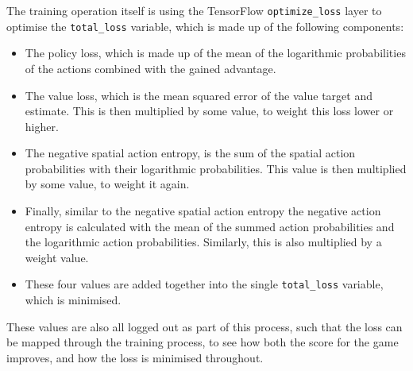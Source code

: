 The training operation itself is using the TensorFlow \texttt{optimize\_loss}
layer to optimise the \texttt{total\_loss} variable, which is made up of the
following components:

\begin{itemize}
    \item The policy loss, which is made up of the mean of the logarithmic
        probabilities of the actions combined with the gained advantage.
    \item The value loss, which is the mean squared error of the value target
        and estimate. This is then multiplied by some value, to weight this loss
        lower or higher.
    \item The negative spatial action entropy, is the sum of the spatial action
        probabilities with their logarithmic probabilities. This value is then
        multiplied by some value, to weight it again.
    \item Finally, similar to the negative spatial action entropy the negative
        action entropy is calculated with the mean of the summed action
        probabilities and the logarithmic action probabilities. Similarly, this
        is also multiplied by a weight value.
    \item These four values are added together into the single
        \texttt{total\_loss} variable, which is minimised.
\end{itemize}

These values are also all logged out as part of this process, such that the loss
can be mapped through the training process, to see how both the score for the
game improves, and how the loss is minimised throughout.

